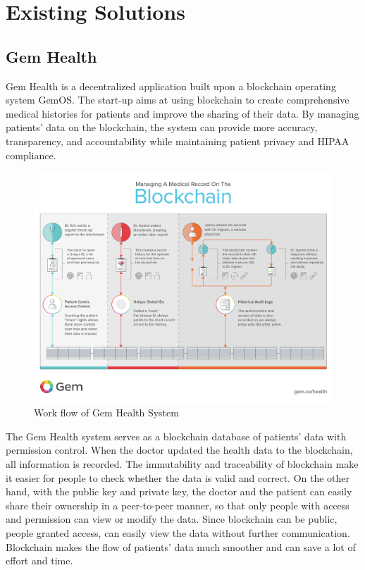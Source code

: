 \documentclass{article}
\begin{document}
\section{Existing Solutions}
\subsection{Gem Health}
Gem Health is a decentralized application built upon a blockchain operating system GemOS\cite{Gem}. The start-up aims at using blockchain to create comprehensive medical histories for patients and improve the sharing of their data\cite{GemHealth}. By managing patients' data on the blockchain, the system can provide more accuracy, transparency, and accountability while maintaining patient privacy and HIPAA compliance\cite{GemBlog}. 
\begin{figure}[H]
    \centering
    \includegraphics[scale=0.15]{GemBlockchain.jpg}
    \caption{Work flow of Gem Health System}
\end{figure}
The Gem Health system serves as a blockchain database of patients' data with permission control. When the doctor updated the health data to the blockchain, all information is recorded. The immutability and traceability of blockchain make it easier for people to check whether the data is valid and correct. On the other hand, with the public key and private key, the doctor and the patient can easily share their ownership in a peer-to-peer manner, so that only people with access and permission can view or modify the data. Since blockchain can be public, people granted access, can easily view the data without further communication. Blockchain makes the flow of patients' data much smoother and can save a lot of effort and time.
\end{document}

